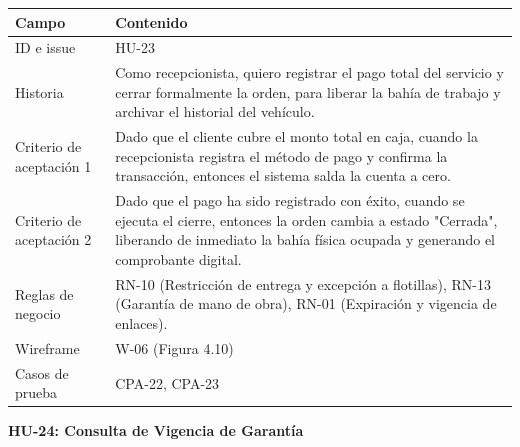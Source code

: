 {\def\LTcaptype{none} %
\begin{longtable}[]{@{}
  >{\raggedright\arraybackslash}p{}
  >{\raggedright\arraybackslash}p{}@{}}
\toprule\noalign{}
\begin{minipage}[b]{\linewidth}\raggedright
\textbf{Campo}
\end{minipage} & \begin{minipage}[b]{\linewidth}\raggedright
\textbf{Contenido}
\end{minipage} \\
\midrule\noalign{}
\endhead
\bottomrule\noalign{}
\endlastfoot
ID e issue & HU-23 \\
Historia & Como recepcionista, quiero registrar el pago total del
servicio y cerrar formalmente la orden, para liberar la bahía de trabajo
y archivar el historial del vehículo. \\
Criterio de aceptación 1 & Dado que el cliente cubre el monto total en
caja, cuando la recepcionista registra el método de pago y confirma la
transacción, entonces el sistema salda la cuenta a cero. \\
Criterio de aceptación 2 & Dado que el pago ha sido registrado con
éxito, cuando se ejecuta el cierre, entonces la orden cambia a estado
"Cerrada", liberando de inmediato la bahía física ocupada y generando el
comprobante digital. \\
Reglas de negocio & RN-10 (Restricción de entrega y excepción a
flotillas), RN-13 (Garantía de mano de obra), RN-01 (Expiración y
vigencia de enlaces). \\
Wireframe & W-06 (Figura 4.10) \\
Casos de prueba & CPA-22, CPA-23 \\
\end{longtable}
}

\textbf{HU-24: Consulta de Vigencia de Garantía}

